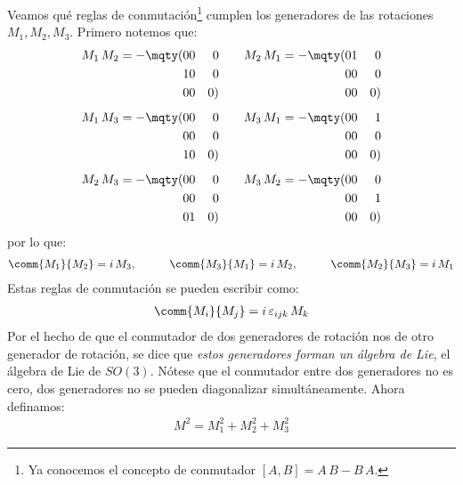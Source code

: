 Veamos qué reglas de conmutación\footnote{Ya conocemos el concepto de conmutador $[A, B] = A \, B - B \, A$.} cumplen los generadores de las rotaciones $M_{1}, M_{2}, M_{3}$. Primero notemos que:
\begin{align}
\begin{aligned}
M_{1} \, M_{2} = - \mqty(0 & 0 & 0 \\ 1 & 0 & 0 \\ 0 & 0 & 0) \\[0.5em] 
M_{1} \, M_{3} = - \mqty(0 & 0 & 0 \\ 0 & 0 & 0 \\ 1 & 0 & 0) \\[0.5em]
M_{2} \, M_{3} = - \mqty(0 & 0 & 0 \\ 0 & 0 & 0 \\ 0 & 1 & 0)
\end{aligned}
\qquad
\begin{aligned}
M_{2} \, M_{1} = - \mqty(0 & 1 & 0 \\ 0 & 0 & 0 \\ 0 & 0 & 0) \\[0.5em]
M_{3} \, M_{1} = - \mqty(0 & 0 & 1 \\ 0 & 0 & 0 \\ 0 & 0 & 0) \\[0.5em]
M_{3} \, M_{2} = - \mqty(0 & 0 & 0 \\ 0 & 0 & 1 \\ 0 & 0 & 0)
\end{aligned}
\label{eq:ecuacion_10_081}
\end{align}
por lo que:
\begin{align}
\comm{M_{1}}{M_{2}} = i \, M_{3}, \hspace{1cm} \comm{M_{3}}{M_{1}} = i \, M_{2}, \hspace{1cm} \comm{M_{2}}{M_{3}} = i \, M_{1} \label{eq:ecuacion_10_082}
\end{align}
Estas reglas de conmutación se pueden escribir como:
\begin{align}
\comm{M_{i}}{M_{j}} = i \, \varepsilon_{ijk} \, M_{k}
\label{eq:ecuacion_10_083}
\end{align}
Por el hecho de que el conmutador de dos generadores de rotación nos de otro generador de rotación, se dice que \emph{estos generadores forman un álgebra de Lie}, el álgebra de Lie de $SO(3)$. Nótese que el conmutador entre dos generadores no es cero, dos generadores no se pueden diagonalizar simultáneamente. Ahora definamos:
\begin{align}
M^{2} = M_{1}^{2} + M_{2}^{2} + M_{3}^{2}
\label{eq:ecuacion_10_084}
\end{align}
